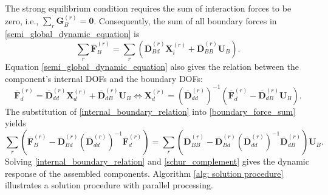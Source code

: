 The strong equilibrium condition requires the sum of interaction forces to be zero, i.e., $\sum_{r}\mathbf{G}_{B}^{(r)}=\mathbf{0}$.
{Consequently, the sum of all boundary forces in \eqref{semi_global_dynamic_equation} is}%
\begin{equation}
    \sum_{r}{
        \overline{\mathbf{F}}_{B}^{(r)}
    }
    =
    \sum_{r}{\left(
        \overline{\mathbf{D}}_{Bd}^{(r)}
        \mathbf{X}_{i}^{(r)}
        +
        \overline{\mathbf{D}}_{BB}^{(r)}
        \mathbf{U}_{B}
    \right)}.
    \label{boundary_force_sum}
\end{equation}
Equation \eqref{semi_global_dynamic_equation} also gives the relation between the component's internal DOFs and the boundary DOFs:
\begin{equation}
    \overline{\mathbf{F}}_{d}^{(r)}
    =
    \overline{\mathbf{D}}_{dd}^{(r)}
    \mathbf{X}_{d}^{(r)}
    +
    \overline{\mathbf{D}}_{dB}^{(r)}
    \mathbf{U}_{B}
    \iff
    \mathbf{X}_{d}^{(r)}
    =
    \left(
        \overline{\mathbf{D}}_{dd}^{(r)}
    \right)^{-1}
    \left(
        \overline{\mathbf{F}}_{d}^{(r)}
        -
        \overline{\mathbf{D}}_{dB}^{(r)}
        \mathbf{U}_{B}
    \right).
    \label{internal_boundary_relation}
\end{equation}
The substitution of \eqref{internal_boundary_relation} into \eqref{boundary_force_sum} yields
\begin{equation}
    \sum_{r}{\left(
        \overline{\mathbf{F}}_{B}^{(r)}
        -
        \overline{\mathbf{D}}_{Bd}^{(r)}
        \left(
            \overline{\mathbf{D}}_{dd}^{(r)}
        \right)^{-1}
        \overline{\mathbf{F}}_{d}^{(r)}
    \right)}
    =
    \sum_{r}{\left(
        \overline{\mathbf{D}}_{BB}^{(r)}
        -
        \overline{\mathbf{D}}_{Bd}^{(r)}
        \left(
            \overline{\mathbf{D}}_{dd}^{(r)}
        \right)^{-1}
        \overline{\mathbf{D}}_{dB}^{(r)}
    \right)}
    \mathbf{U}_{B}.
    \label{schur_complement}
\end{equation}
Solving \eqref{internal_boundary_relation} and \eqref{schur_complement} gives the dynamic response of the assembled components.
Algorithm \ref{alg: solution procedure} illustrates a solution procedure with parallel processing.
